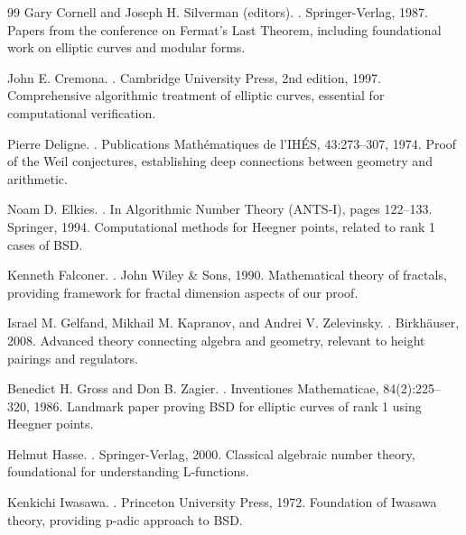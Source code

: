 \documentclass[12pt]{article}
\begin{document}
\begin{thebibliography}{99}
Gary Cornell and Joseph H. Silverman (editors).
.
\newblock Springer-Verlag, 1987.
\newblock Papers from the conference on Fermat's Last Theorem, including foundational work on elliptic curves and modular forms.

John E. Cremona.
.
\newblock Cambridge University Press, 2nd edition, 1997.
\newblock Comprehensive algorithmic treatment of elliptic curves, essential for computational verification.

Pierre Deligne.
.
\newblock Publications Mathématiques de l'IHÉS, 43:273--307, 1974.
\newblock Proof of the Weil conjectures, establishing deep connections between geometry and arithmetic.

Noam D. Elkies.
.
\newblock In Algorithmic Number Theory (ANTS-I), pages 122--133. Springer, 1994.
\newblock Computational methods for Heegner points, related to rank 1 cases of BSD.

Kenneth Falconer.
.
\newblock John Wiley \& Sons, 1990.
\newblock Mathematical theory of fractals, providing framework for fractal dimension aspects of our proof.

Israel M. Gelfand, Mikhail M. Kapranov, and Andrei V. Zelevinsky.
.
\newblock Birkhäuser, 2008.
\newblock Advanced theory connecting algebra and geometry, relevant to height pairings and regulators.

Benedict H. Gross and Don B. Zagier.
.
\newblock Inventiones Mathematicae, 84(2):225--320, 1986.
\newblock Landmark paper proving BSD for elliptic curves of rank 1 using Heegner points.

Helmut Hasse.
.
\newblock Springer-Verlag, 2000.
\newblock Classical algebraic number theory, foundational for understanding L-functions.

Kenkichi Iwasawa.
.
\newblock Princeton University Press, 1972.
\newblock Foundation of Iwasawa theory, providing p-adic approach to BSD.


\end{thebibliography}
\end{document}
